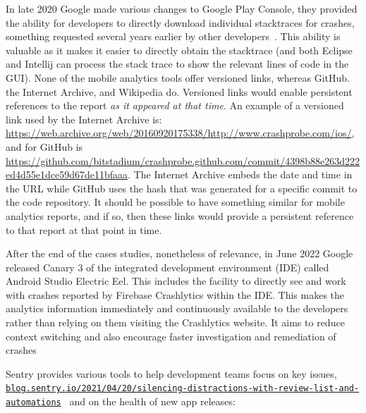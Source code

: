 In late 2020 Google made various changes to Google Play Console, they provided the ability for developers to directly download individual stacktraces for crashes, something requested several years earlier by other developers~. %
This ability is valuable as it makes it easier to directly obtain the stacktrace (and both Eclipse and Intellij can process the stack trace to show the relevant lines of code in the GUI). None of the mobile analytics tools offer versioned links, whereas GitHub. the Internet Archive, and Wikipedia do. Versioned links would enable persistent references to the report \emph{as it appeared at that time}. An example of a versioned link used by the Internet Archive is: {\small \url{https://web.archive.org/web/20160920175338/http://www.crashprobe.com/ios/}}, and for GitHub is 
{\small \url{https://github.com/bitstadium/crashprobe.github.com/commit/4398b88e263d222ed4d55e1dce59d67de11bfaaa}}. The Internet Archive embeds the date and time in the URL while GitHub uses the hash that was generated for a specific commit to the code repository. It should be possible to have something similar for mobile analytics reports, and if so, then these links would provide a persistent reference to that report at that point in time.

After the end of the cases studies, nonetheless of relevance, in June 2022 Google released Canary 3 of the integrated development environment (IDE) called Android Studio Electric Eel. This includes the facility to directly see and work with crashes reported by Firebase Crashlytics within the IDE. This makes the analytics information immediately and continuously available to the developers rather than relying on them visiting the Crashlytics website. It aims to reduce context switching and also encourage faster investigation and remediation of crashes%


Sentry provides various tools to help development teams focus on key issues,  \href{https://blog.sentry.io/2021/04/20/silencing-distractions-with-review-list-and-automations}{\nolinkurl{blog.sentry.io/2021/04/20/silencing-distractions-with-review-list-and-automations}}~ and on the health of new app releases: %



